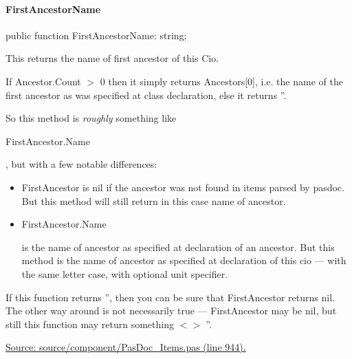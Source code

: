 \documentclass{report}
\newif\ifpdf
\begin{document}
\paragraph*{FirstAncestorName}\hspace*{\fill}

\label{PasDoc_Items.TPasCio-FirstAncestorName}
\begin{list}{}{
\setlength{\itemindent}{0cm}
\setlength{\listparindent}{0cm}
\setlength{\leftmargin}{\evensidemargin}
\addtolength{\leftmargin}{\tmplength}
\settowidth{\labelsep}{X}
\addtolength{\leftmargin}{\labelsep}
\setlength{\labelwidth}{\tmplength}
}
\item[\textbf{Declaration}\hfill]
\ifpdf
\begin{flushleft}
\fi
\begin{ttfamily}
public function FirstAncestorName: string;\end{ttfamily}

\ifpdf
\end{flushleft}
\fi

\par
\item[\textbf{Description}]
This returns the name of first ancestor of this Cio.

If Ancestor.Count {$>$} 0 then it simply returns Ancestors[0], i.e. the name of the first ancestor as was specified at class declaration, else it returns ''.

So this method is \textit{roughly} something like \begin{ttfamily}FirstAncestor.Name\end{ttfamily}, but with a few notable differences:

\begin{itemize}
\item  FirstAncestor is nil if the ancestor was not found in items parsed by pasdoc. But this method will still return in this case name of ancestor.
\item \begin{ttfamily}FirstAncestor.Name\end{ttfamily} is the name of ancestor as specified at declaration of an ancestor. But this method is the name of ancestor as specified at declaration of this cio --- with the same letter case, with optional unit specifier.
\end{itemize}

If this function returns '', then you can be sure that FirstAncestor returns nil. The other way around is not necessarily true --- FirstAncestor may be nil, but still this function may return something {$<$}{$>$} ''.\par
\href{https://github.com/pasdoc/pasdoc/blob/master/source/component/PasDoc_Items.pas#L944}{Source: source/component/PasDoc{\_}Items.pas (line 944).}

\end{list}
\end{document}
